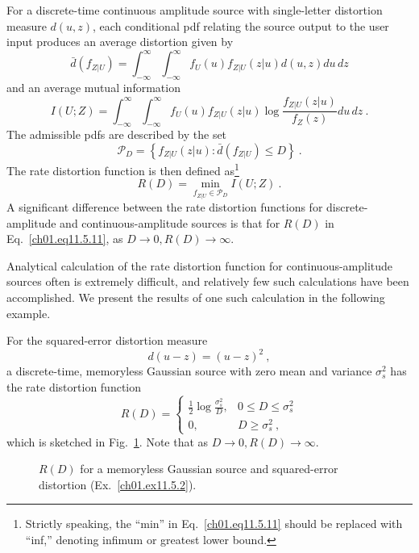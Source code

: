\begin{example}
For a discrete-time continuous amplitude source with single-letter
distortion measure $d(u,z)$, each conditional pdf relating the
source output to the user input produces an average distortion
given by
\begin{equation}
 \bar{d} \left(  f_{Z|U} \right) =
    \int^{\infty}_{- \infty} \int^{\infty}_{- \infty}
     f_U (u) f_{Z|U} (z|u)  d(u,z) du\, dz
\label{ch01.eq11.5.9}
\end{equation}
and an average mutual information
\begin{equation}
     I(U; Z) =
    \int^{\infty}_{- \infty} \int^{\infty}_{- \infty}
     f_U (u) f_{Z|U} (z|u) \log \frac{f_{Z|U}(z|u) }{f_Z(z)}
       du\, dz~.
\label{ch01.eq11.5.10}
\end{equation}
The admissible pdfs are described by the set
$$
  {\mathcal P}_D =
    \left\{ f_{Z|U} (z|u) : \bar{d}
        \left( f_{Z|U} \right)
          \leq D \right\}~.
$$
The rate distortion function is then defined as\footnote{Strictly speaking,
the ``min'' in Eq.~\protect\eqref{ch01.eq11.5.11} should be replaced with
``inf,'' denoting infimum or greatest lower bound.}
\begin{equation}
   R(D) = \min_{ f_{Z|U} \in {\mathcal P}_D }
      I(U; Z)~.
\label{ch01.eq11.5.11}
\end{equation}
A significant difference between the rate distortion functions for
discrete-amplitude and continuous-amplitude sources is that for
$R(D)$ in Eq.~\eqref{ch01.eq11.5.11}, as $D \rightarrow 0, R(D)
\rightarrow \infty$.
\end{example}

Analytical calculation of the rate distortion function for
continuous-amplitude sources often is extremely difficult,
and relatively few such calculations have been accomplished.
We present the results of one such calculation in the following
example.
\begin{example}
\label{ch01.ex11.5.2}
For the squared-error distortion measure
\begin{equation}
        d(u-z) = (u-z)^2~,
\label{ch01.eq11.5.12}
\end{equation}
a discrete-time, memoryless Gaussian source with zero mean and variance
$\sigma^2_s$ has the rate distortion function
\begin{equation}
        R(D) =  %
            \begin{cases}
            \tfrac{1}{2} \log \frac{\sigma^2_s}{D},
                & 0 \leq D \leq \sigma^2_s      \\
            0,  & D \geq \sigma^2_s~,
            \end{cases}
\label{ch01.eq11.5.13}
\end{equation}
which is sketched in Fig.~\ref{ch01.fig11.5.2}.
Note that as $D \rightarrow 0, R(D) \rightarrow \infty$.

\begin{figure}[hbt] %
 \figboxes
\caption{$R(D)$ for a memoryless Gaussian source and squared-error
         distortion (Ex.~\ref{ch01.ex11.5.2}).
\label{ch01.fig11.5.2} }
\end{figure}
\end{example}


